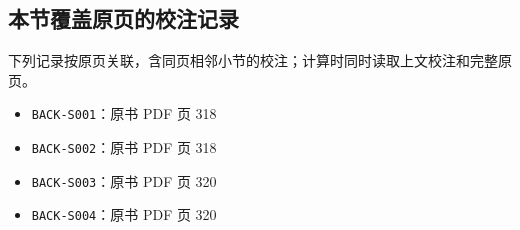 \documentclass[
  10pt,
  fontset=fandol]{ctexart}
\providecommand{\tightlist}{%
  \setlength{\itemsep}{0pt}\setlength{\parskip}{0pt}}
\begin{document}
\subsection{本节覆盖原页的校注记录}\label{ux672cux8282ux8986ux76d6ux539fux9875ux7684ux6821ux6ce8ux8bb0ux5f55}

下列记录按原页关联，含同页相邻小节的校注；计算时同时读取上文校注和完整原页。

\begin{itemize}
\tightlist
\item
  \texttt{BACK-S001}：原书 PDF 页 318
\item
  \texttt{BACK-S002}：原书 PDF 页 318
\item
  \texttt{BACK-S003}：原书 PDF 页 320
\item
  \texttt{BACK-S004}：原书 PDF 页 320
\end{itemize}
\end{document}
